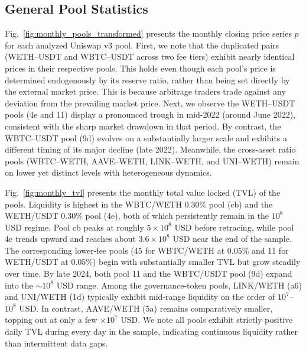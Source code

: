 \documentclass[journal]{IEEEtran}
\begin{document}
\subsection{General Pool Statistics}
\label{sec:general_statistics}

Fig.~\ref{fig:monthly_pools_transformed} presents the monthly closing price series $p$ for each analyzed Uniswap v3 pool. 
First, we note that the duplicated pairs (WETH--USDT and WBTC--USDT across two fee tiers) exhibit nearly identical prices in their respective pools. 
This holds even though each pool’s price is determined endogenously by its reserve ratio, rather than being set directly by the external market price.
This is because arbitrage traders trade against any deviation from the prevailing market price. Next, we observe the WETH--USDT pools (4e and 11) display a pronounced trough in mid-2022 (around June 2022), consistent with the sharp market drawdown in that period. By contrast, the WBTC--USDT pool (9d) evolves on a substantially larger scale and exhibits a different timing of its major decline (late 2022). Meanwhile, the cross-asset ratio pools (WBTC--WETH, AAVE--WETH, LINK--WETH, and UNI--WETH) remain on lower yet distinct levels with heterogeneous dynamics. 

Fig.~\ref{fig:monthly_tvl} presents the monthly total value locked (TVL) of the pools. 
Liquidity is highest in the WBTC/WETH 0.30\% pool (cb) and the WETH/USDT 0.30\% pool (4e), both of which persistently remain in the $10^{8}$ USD regime. 
Pool cb peaks at roughly $5\times10^{8}$ USD before retracing, while pool 4e trends upward and reaches about $3.6\times10^{8}$ USD near the end of the sample.
The corresponding lower-fee pools (45 for WBTC/WETH at 0.05\% and 11 for WETH/USDT at 0.05\%) begin with substantially smaller TVL but grow steadily over time. 
By late 2024, both pool 11 and the WBTC/USDT pool (9d) expand into the $\sim10^{8}$ USD range. 
Among the governance-token pools, LINK/WETH (a6) and UNI/WETH (1d) typically exhibit mid-range liquidity on the order of $10^{7}$--$10^{8}$ USD. 
In contrast, AAVE/WETH (5a) remains comparatively smaller, topping out at only a few $\times10^{7}$ USD.
We note all pools exhibit strictly positive daily TVL during every day in the sample, indicating continuous liquidity rather than intermittent data gaps.

\end{document}
